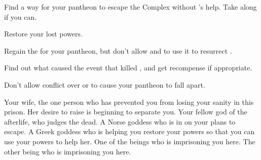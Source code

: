 \documentclass[char]{guardians}
\begin{document}
\begin{itemz}[Goals]
  \item Find a way for your pantheon to escape the Complex without \cSet{}'s help. Take \cHel{} along if you can.
  \item Restore your lost powers.
  \item Regain the \iNecro{} for your pantheon, but don't allow \cIsis{} and \cAnubis{} to use it to resurrect \cSet{}.
  \item Find out what caused the event that killed \cEgyptianHuman{}, and get recompense if appropriate.
  \item Don't allow conflict over \cEgyptianHuman{} or \cSet{} to cause your pantheon to fall apart.
\end{itemz}

\begin{contacts}
  \contact{\cIsis{}} Your wife, the one person who has prevented you from losing your sanity in this prison. Her desire to raise \cSet{} is beginning to separate you.
  \contact{\cAnubis{}} Your fellow god of the afterlife, who judges the dead.
  \contact{\cHel{}} A Norse goddess who is in on your plans to escape.
  \contact{\cHera{}} A Greek goddess who is helping you restore your powers so that you can use your powers to help her.
   One of the beings who is imprisoning you here.
   The other being who is imprisoning you here.
\end{contacts}
\end{document}
